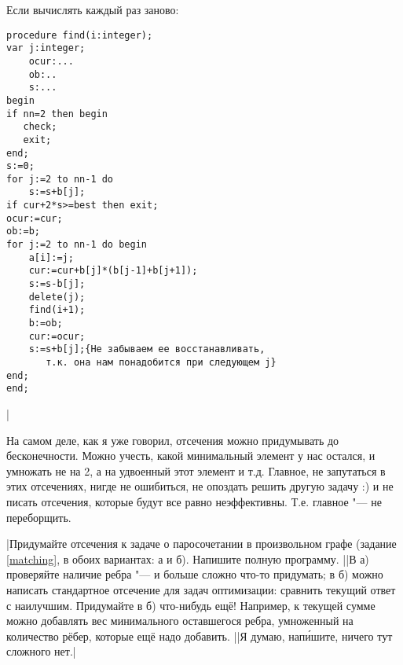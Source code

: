 Если вычислять каждый раз заново:

\begin{codesample}\begin{verbatim}
procedure find(i:integer);
var j:integer;
    ocur:...
    ob:..
    s:...
begin
if nn=2 then begin
   check;
   exit;
end;
s:=0;
for j:=2 to nn-1 do
    s:=s+b[j];
if cur+2*s>=best then exit;
ocur:=cur;
ob:=b;
for j:=2 to nn-1 do begin
    a[i]:=j;
    cur:=cur+b[j]*(b[j-1]+b[j+1]);
    s:=s-b[j];
    delete(j);
    find(i+1);
    b:=ob;
    cur:=ocur;
    s:=s+b[j];{Не забываем ее восстанавливать, 
       т.к. она нам понадобится при следующем j}
end;
end;
\end{verbatim}
\end{codesample}
|

На самом деле, как я уже говорил, отсечения можно придумывать до бесконечности. Можно учесть, какой минимальный элемент у нас остался, и умножать не на 2, а на удвоенный этот элемент и т.д. Главное, не запутаться в этих отсечениях, нигде не ошибиться, не опоздать решить другую задачу :) и не писать отсечения, которые будут все равно неэффективны. Т.е. главное "--- не переборщить.

\task|Придумайте отсечения к задаче о паросочетании в произвольном графе 
(задание \ref{matching}, в обоих вариантах: а и б). Напишите полную программу.
||В а) проверяйте наличие ребра "--- и больше сложно что-то придумать; в б) можно написать стандартное отсечение для задач 
оптимизации: сравнить текущий ответ с наилучшим. Придумайте в б) что-нибудь ещё! Например, к текущей сумме можно 
добавлять вес минимального оставшегося ребра, умноженный на количество рёбер, которые ещё 
надо добавить.
||Я думаю, нап\'{и}шите, ничего тут сложного нет.|
